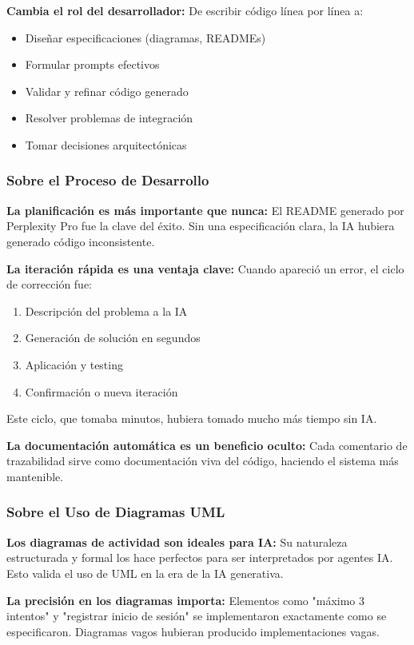 \documentclass[11pt,a4paper]{article}
\begin{document}
\textbf{Cambia el rol del desarrollador:} De escribir código línea por línea a:
\begin{itemize}
    \item Diseñar especificaciones (diagramas, READMEs)
    \item Formular prompts efectivos
    \item Validar y refinar código generado
    \item Resolver problemas de integración
    \item Tomar decisiones arquitectónicas
\end{itemize}

\subsubsection{Sobre el Proceso de Desarrollo}

\textbf{La planificación es más importante que nunca:} El README generado por Perplexity Pro fue la clave del éxito. Sin una especificación clara, la IA hubiera generado código inconsistente.

\textbf{La iteración rápida es una ventaja clave:} Cuando apareció un error, el ciclo de corrección fue:
\begin{enumerate}
    \item Descripción del problema a la IA
    \item Generación de solución en segundos
    \item Aplicación y testing
    \item Confirmación o nueva iteración
\end{enumerate}

Este ciclo, que tomaba minutos, hubiera tomado mucho más tiempo sin IA.

\textbf{La documentación automática es un beneficio oculto:} Cada comentario de trazabilidad sirve como documentación viva del código, haciendo el sistema más mantenible.

\subsubsection{Sobre el Uso de Diagramas UML}

\textbf{Los diagramas de actividad son ideales para IA:} Su naturaleza estructurada y formal los hace perfectos para ser interpretados por agentes IA. Esto valida el uso de UML en la era de la IA generativa.

\textbf{La precisión en los diagramas importa:} Elementos como "máximo 3 intentos" y "registrar inicio de sesión" se implementaron exactamente como se especificaron. Diagramas vagos hubieran producido implementaciones vagas.
\end{document}
